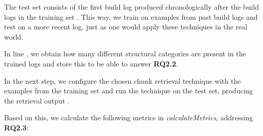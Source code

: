 The test set consists of the first build log produced
chronologically after the build logs in the training set .
This way, we train on examples from past build logs and test on
a more recent log, just as one would apply these techniques in the
real world.

In line , we obtain how many different structural categories
are present in the trained logs and store this to be able to answer
\textbf{RQ2.2}.

In the next step, we configure the chosen chunk retrieval technique with
the examples from the training set  and run the technique
on the
test set, producing the retrieval output .

Based on this, we calculate the following metrics in
\emph{calculateMetrics}, addressing \textbf{RQ2.3}:

